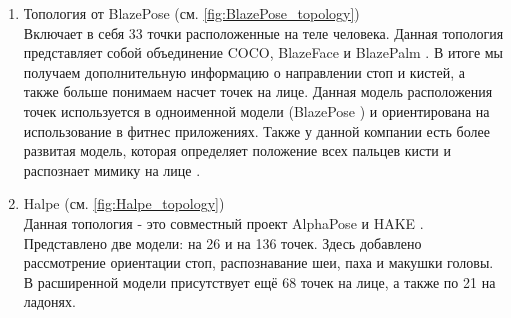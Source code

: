 \begin{enumerate} 
  \item Топология от BlazePose (см. \autoref{fig:BlazePose_topology})\\
  Включает в себя 33 точки расположенные на теле человека. Данная топология представляет собой объединение COCO, BlazeFace \cite{BlazeFace} и BlazePalm \cite{Hands}. В итоге мы получаем дополнительную информацию о направлении стоп и кистей, а также больше понимаем насчет точек на лице. Данная модель расположения точек используется в одноименной модели (BlazePose \cite{BlazePose}) и ориентирована на использование в фитнес приложениях. Также у данной компании есть более развитая модель, которая определяет положение всех пальцев кисти и распознает мимику на лице \cite{Holistic}.
  \item Halpe (см. \autoref{fig:Halpe_topology})\\
  Данная топология - это совместный проект AlphaPose \cite{fang2017rmpe} и HAKE \cite{li2020pastanet}. Представлено две модели: на 26 и на 136 точек. Здесь добавлено рассмотрение ориентации стоп, распознавание шеи, паха и макушки головы. В расширенной модели присутствует ещё 68 точек на лице, а также по 21 на ладонях.
\end{enumerate}

